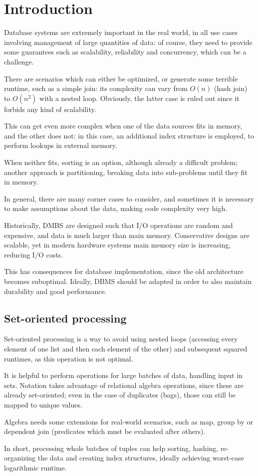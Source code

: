 \section{Introduction}
Database systems are extremely important in the real world, in all use cases involving management of large quantities of data: of course, they need to provide some guarantees such as scalability, reliability and concurrency, which can be a challenge.

There are scenarios which can either be optimized, or generate some terrible runtime, such as a simple join: its complexity can vary from $O(n)$ (hash join) to $O(n^2)$ with a nested loop. Obviously, the latter case is ruled out since it forbids any kind of scalability.

This can get even more complex when one of the data sources fits in memory, and the other does not: in this case, an additional index structure is employed, to perform lookups in external memory.

When neither fits, sorting is an option, although already a difficult problem; another approach is partitioning, breaking data into sub-problems until they fit in memory. 

In general, there are many corner cases to consider, and sometimes it is necessary to make assumptions about the data, making code complexity very high. 

Historically, DMBS are designed such that I/O operations are random and expensive, and data is much larger than main memory. Conservative designs are scalable, yet in modern hardware systems main memory size is increasing, reducing I/O costs.

This has consequences for database implementation, since the old architecture becomes suboptimal. Ideally, DBMS should be adapted in order to also maintain durability and good performance.

\subsection{Set-oriented processing}
Set-oriented processing is a way to avoid using nested loops (accessing every element of one list and then each element of the other) and subsequent squared runtimes, as this operation is not optimal.

It is helpful to perform operations for large batches of data, handling input in sets. Notation takes advantage of relational algebra operations, since these are already set-oriented; even in the case of duplicates (bags), those can still be mapped to unique values.

Algebra needs some extensions for real-world scenarios, such as map, group by or dependent join (predicates which must be evaluated after others).

In short, processing whole batches of tuples can help sorting, hashing, re-organizing the data and creating index structures, ideally achieving worst-case logarithmic runtime.



